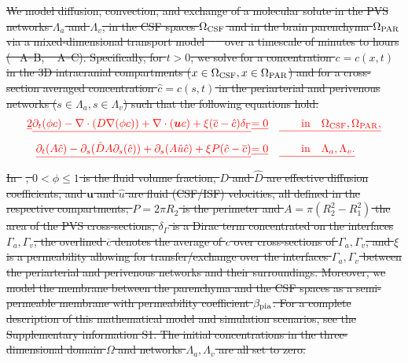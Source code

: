 \documentclass[fleqn,10pt]{wlscirep}
\providecommand{\DIFdel}[1]{{\protect\color{red}\sout{#1}}}                      %
\providecommand{\DIFdelbegin}{} %
\begin{document}
\DIFdelbegin \DIFdel{We model diffusion, convection, and exchange of a molecular solute in
the PVS networks $\Lambda_a$ and $\Lambda_v$, in the CSF spaces
$\Omega_{\rm CSF}$ and in the brain parenchyma $\Omega_{\rm PAR}$ via
a mixed-dimensional transport model~\mbox{%
\cite{masri2024modelling,laurino2019derivation} }\hspace{0pt}%
over a
timescale of minutes to hours (\mbox{%
\Cref{fig:results1}}\hspace{0pt}%
A--B,
\mbox{%
\Cref{fig:csf}}\hspace{0pt}%
A--C). Specifically, for $t > 0$, we solve for a
concentration $c = c(x, t)$ in the 3D intracranial compartments ($x
\in \Omega_{\rm CSF}, x \in \Omega_{\rm PAR}$) and for a cross-section
averaged concentration $\hat{c} = \hat{c}(s, t)$ in the periarterial
and perivenous networks ($s \in \Lambda_a, s \in \Lambda_v$) such that
the following equations hold:
}%
\begin{align*}{\DIFdel{2}}
  \DIFdel{\partial_t (\phi c) - \nabla \cdot (D \nabla (\phi c) ) + \nabla \cdot (\bm u c ) + \xi (\overline{c} - \hat c ) \delta_\Gamma }& \DIFdel{= 0 }&& \DIFdel{\quad \quad \mathrm{in} \quad \Omega_{\rm CSF}, \Omega_{\rm{PAR}},
  \label{eq:multi_transport_3d}
  }\\ 
  \DIFdel{\partial_t (A  \hat c) - \partial_s(\hat D A \partial_s ( \hat c)) +\partial_s(A \hat u \hat c )  +  \xi P (\hat c - \overline{c})  }&\DIFdel{= 0 }&& \DIFdel{\quad \quad \mathrm{in} \quad  \Lambda_a, \Lambda_v .
  \label{eq:multi_transport_1d}
 }\end{align*}%
\DIFdel{In~}%
\DIFdel{, $0 < \phi \leqslant 1$ is the fluid
volume fraction, $D$ and $\hat{D}$ are effective diffusion
coefficients, and $\bm u$ and $\hat{u}$ are fluid (CSF/ISF)
velocities, all defined in the respective compartments; $P = 2 \pi
R_2$ is the perimeter and $A = \pi (R_2^2 - R_1^2)$ the area of the
PVS cross-sections, $\delta_{\Gamma}$ is a Dirac term concentrated on
the interfaces $\Gamma_a, \Gamma_v$, the overlined $\overline{c}$
denotes the average of $c$ over cross-sections of $\Gamma_a,
\Gamma_v$, and $\xi$ is a permeability allowing for transfer/exchange
over the interfaces $\Gamma_a, \Gamma_v$ between the periarterial and
perivenous networks and their surroundings.  Moreover, we model the
membrane between the parenchyma and the CSF spaces as a semi-permeable
membrane with permeability coefficient $\beta_{\rm pia}$. For a
complete description of this mathematical model and simulation
scenarios, see the Supplementary information S1. The initial concentrations
in the three-dimensional domain $\Omega$ and networks $\Lambda_a,
\Lambda_v$ are all set to zero.
}%
\end{document}
